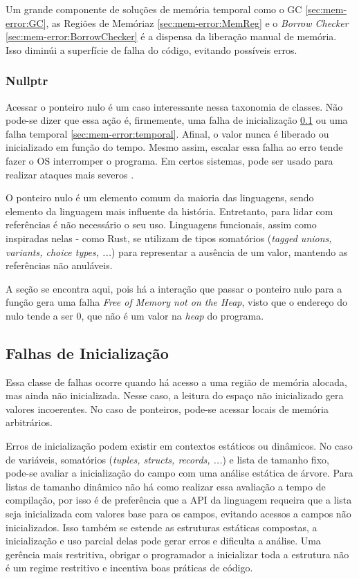 Um grande componente de soluções de memória temporal como o GC \ref{sec:mem-error:GC}, as Regiões de Memóriaz \ref{sec:mem-error:MemReg} e o \emph{Borrow Checker} \ref{sec:mem-error:BorrowChecker} é a dispensa da liberação manual de memória. Isso diminúi a superfície de falha do código, evitando possíveis erros.

\subsubsection{Nullptr}
\label{sec:mem-error:temporal:null}

Acessar o ponteiro nulo é um caso interessante nessa taxonomia de classes. Não pode-se dizer que essa ação é, firmemente, uma falha de inicialização \ref{sec:mem-error:init} ou uma falha temporal \ref{sec:mem-error:temporal}. Afinal, o valor nunca é liberado ou inicializado em função do tempo. Mesmo assim, escalar essa falha ao erro tende fazer o OS interromper o programa. Em certos sistemas, pode ser usado para realizar ataques mais severos \cite[p.4]{MemErrorPastPresentFuture}.

O ponteiro nulo é um elemento comum da maioria das linguagens, sendo elemento da linguagem mais influente da história. Entretanto, para lidar com referências é não necessário o seu uso. Linguagens funcionais, assim como inspiradas nelas - como Rust, se utilizam de tipos somatórios (\emph{tagged unions, variants, choice types, ...}) para representar a ausência de um valor, mantendo as referências não anuláveis.

A seção se encontra aqui, pois há a interação que passar o ponteiro nulo para a função \FREE gera uma falha \emph{Free of Memory not on the Heap}, visto que o endereço do nulo tende a ser 0, que não é um valor na \emph{heap} do programa.


\subsection{Falhas de Inicialização}
\label{sec:mem-error:init}

Essa classe de falhas ocorre quando há acesso a uma região de memória alocada, mas ainda não inicializada. Nesse caso, a leitura do espaço não inicializado gera valores incoerentes. No caso de ponteiros, pode-se acessar locais de memória arbitrários.

Erros de inicialização podem existir em contextos estáticos ou dinâmicos. No caso de variáveis, somatórios (\emph{tuples, structs, records, ...}) e lista de tamanho fixo, pode-se avaliar a inicialização do campo com uma análise estática de árvore. Para listas de tamanho dinâmico não há como realizar essa avaliação a tempo de compilação, por isso é de preferência que a API da linguagem requeira que a lista seja inicializada com valores base para os campos, evitando acessos a campos não inicializados. Isso também se estende as estruturas estáticas compostas, a inicialização e uso parcial delas pode gerar erros e dificulta a análise. Uma gerência mais restritiva, obrigar o programador a inicializar toda a estrutura não é um regime restritivo e incentiva boas práticas de código.

